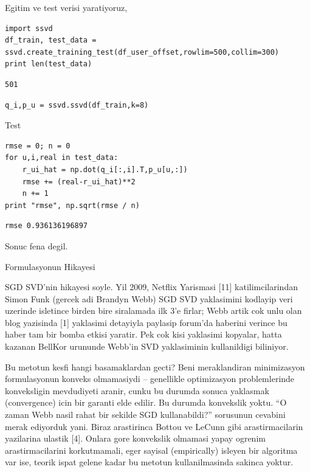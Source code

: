 \documentclass[12pt,fleqn]{article}\usepackage{../common}
\begin{document}
Egitim ve test verisi yaratiyoruz,

\begin{verbatim}
import ssvd
df_train, test_data = ssvd.create_training_test(df_user_offset,rowlim=500,collim=300)
print len(test_data)
\end{verbatim}

\begin{verbatim}
501
\end{verbatim}

\begin{verbatim}
q_i,p_u = ssvd.ssvd(df_train,k=8)
\end{verbatim}

Test

\begin{verbatim}
rmse = 0; n = 0
for u,i,real in test_data:
    r_ui_hat = np.dot(q_i[:,i].T,p_u[u,:])
    rmse += (real-r_ui_hat)**2
    n += 1
print "rmse", np.sqrt(rmse / n)
\end{verbatim}

\begin{verbatim}
rmse 0.936136196897
\end{verbatim}

Sonuc fena degil.

Formulasyonun Hikayesi

SGD SVD'nin hikayesi soyle. Yil 2009, Netflix Yarismasi [11]
katilimcilarindan Simon Funk (gercek adi Brandyn Webb) SGD SVD yaklasimini
kodlayip veri uzerinde isletince birden bire siralamada ilk 3'e firlar;
Webb artik cok unlu olan blog yazisinda [1] yaklasimi detayiyla paylasip
forum'da haberini verince bu haber tam bir bomba etkisi yaratir. Pek cok
kisi yaklasimi kopyalar, hatta kazanan BellKor urununde Webb'in SVD
yaklasiminin kullanildigi biliniyor.

Bu metotun kesfi hangi basamaklardan gecti? Beni meraklandiran minimizasyon
formulasyonun konveks olmamasiydi -- genellikle optimizasyon problemlerinde
konveksligin mevdudiyeti aranir, cunku bu durumda sonuca yaklasmak
(convergence) icin bir garanti elde edilir. Bu durumda konvekslik
yoktu. ``O zaman Webb nasil rahat bir sekilde SGD kullanabildi?'' sorusunun
cevabini merak ediyorduk yani. Biraz arastirinca Bottou ve LeCunn gibi
arastirmacilarin yazilarina ulastik [4]. Onlara gore konvekslik olmamasi
yapay ogrenim arastirmacilarini korkutmamali, eger sayisal (empirically)
isleyen bir algoritma var ise, teorik ispat gelene kadar bu metotun
kullanilmasinda sakinca yoktur.
\end{document}
